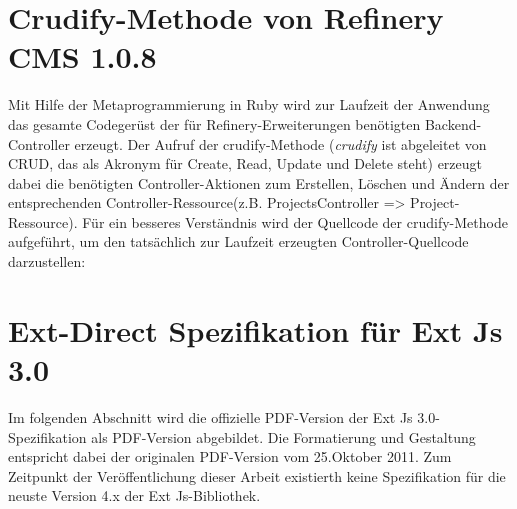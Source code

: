 \section{Crudify-Methode von Refinery CMS 1.0.8}
\label{crudifyanhang}
Mit Hilfe der Metaprogrammierung in Ruby wird zur Laufzeit der Anwendung das gesamte Codegerüst der für Refinery-Erweiterungen benötigten Backend-Controller erzeugt. Der Aufruf der crudify-Methode (\emph{crudify} ist abgeleitet von CRUD, das als Akronym für Create, Read, Update und Delete steht) erzeugt dabei die benötigten Controller-Aktionen zum Erstellen, Löschen und Ändern der entsprechenden Controller-Ressource(z.B. ProjectsController => Project-Ressource).
Für ein besseres Verständnis wird der Quellcode der crudify-Methode aufgeführt, um den tatsächlich zur Laufzeit erzeugten Controller-Quellcode darzustellen:

\newpage
\section{Ext-Direct Spezifikation für Ext Js 3.0}
Im folgenden Abschnitt wird die offizielle PDF-Version der Ext Js 3.0-Spezifikation als PDF-Version abgebildet. Die Formatierung und Gestaltung entspricht dabei der originalen PDF-Version vom 25.Oktober 2011. Zum Zeitpunkt der Veröffentlichung dieser Arbeit existierth keine Spezifikation für die neuste Version 4.x der Ext Js-Bibliothek.
\label{extspec}

